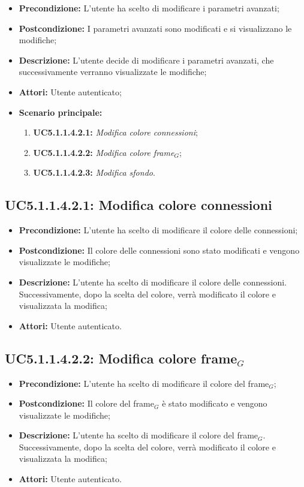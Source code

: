 \begin{itemize}
	\item \textbf{Precondizione:} L'utente ha scelto di modificare i parametri avanzati;
	\item \textbf{Postcondizione:} I parametri avanzati sono modificati e si visualizzano le modifiche;
	\item \textbf{Descrizione:} L'utente decide di modificare i parametri avanzati, che successivamente verranno visualizzate le modifiche;
	\item \textbf{Attori:} Utente autenticato;
	\item \textbf{Scenario principale:}
	\begin{enumerate}
		\item \textbf{ UC5.1.1.4.2.1:} \textit{ Modifica colore connessioni};
		\item \textbf{ UC5.1.1.4.2.2:} \textit{ Modifica colore frame$_G$};
		\item \textbf{ UC5.1.1.4.2.3:} \textit{ Modifica sfondo}.
	\end{enumerate}
\end{itemize}
\subsection{ UC5.1.1.4.2.1: Modifica colore connessioni}

\begin{itemize}
	\item \textbf{Precondizione:} L'utente ha scelto di modificare il colore delle connessioni;
	\item \textbf{Postcondizione:} Il colore delle connessioni sono stato modificati e vengono visualizzate le modifiche;
	\item \textbf{Descrizione:} L'utente ha scelto di modificare il colore delle connessioni.  Successivamente, dopo la scelta del colore, verrà modificato il colore e visualizzata la modifica;
	\item \textbf{Attori:} Utente autenticato.
\end{itemize}
\subsection{ UC5.1.1.4.2.2: Modifica colore frame$_G$}

\begin{itemize}
	\item \textbf{Precondizione:} L'utente ha scelto di modificare il colore del frame$_G$;
	\item \textbf{Postcondizione:} Il colore del frame$_G$ è stato modificato e vengono visualizzate le modifiche;
	\item \textbf{Descrizione:} L'utente ha scelto di modificare il colore del frame$_G$.  Successivamente, dopo la scelta del colore, verrà modificato il colore e visualizzata la modifica;
	\item \textbf{Attori:} Utente autenticato.
\end{itemize}
